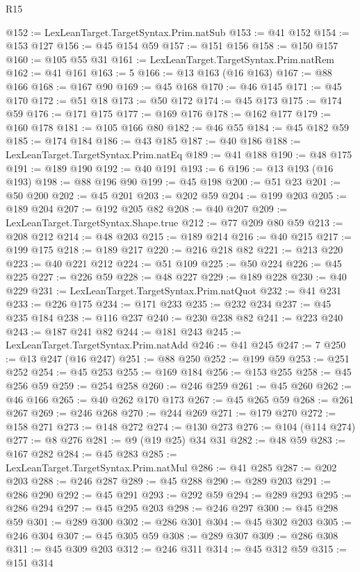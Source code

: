 \begin{lexlean}{R15}
\begin{coremodule}
@152 := LexLeanTarget.TargetSyntax.Prim.natSub
@153 := @41 @152
@154 := @153 @127
@156 := @45 @154 @59
@157 := @151 @156
@158 := @150 @157
@160 := @105 @55 @31
@161 := LexLeanTarget.TargetSyntax.Prim.natRem
@162 := @41 @161
@163 := 5
@166 := @13 @163 (@16 @163)
@167 := @88 @166
@168 := @167 @90
@169 := @45 @168
@170 := @46 @145
@171 := @45 @170
@172 := @51 @18
@173 := @50 @172
@174 := @45 @173
@175 := @174 @59
@176 := @171 @175
@177 := @169 @176
@178 := @162 @177
@179 := @160 @178
@181 := @105 @166 @80
@182 := @46 @55
@184 := @45 @182 @59
@185 := @174 @184
@186 := @43 @185
@187 := @40 @186
@188 := LexLeanTarget.TargetSyntax.Prim.natEq
@189 := @41 @188
@190 := @48 @175
@191 := @189 @190
@192 := @40 @191
@193 := 6
@196 := @13 @193 (@16 @193)
@198 := @88 @196 @90
@199 := @45 @198
@200 := @51 @23
@201 := @50 @200
@202 := @45 @201
@203 := @202 @59
@204 := @199 @203
@205 := @189 @204
@207 := @192 @205 @82
@208 := @40 @207
@209 := LexLeanTarget.TargetSyntax.Shape.true
@212 := @77 @209 @80 @59
@213 := @208 @212
@214 := @48 @203
@215 := @189 @214
@216 := @40 @215
@217 := @199 @175
@218 := @189 @217
@220 := @216 @218 @82
@221 := @213 @220
@223 := @40 @221 @212
@224 := @51 @109
@225 := @50 @224
@226 := @45 @225
@227 := @226 @59
@228 := @48 @227
@229 := @189 @228
@230 := @40 @229
@231 := LexLeanTarget.TargetSyntax.Prim.natQuot
@232 := @41 @231
@233 := @226 @175
@234 := @171 @233
@235 := @232 @234
@237 := @45 @235 @184
@238 := @116 @237
@240 := @230 @238 @82
@241 := @223 @240
@243 := @187 @241 @82
@244 := @181 @243
@245 := LexLeanTarget.TargetSyntax.Prim.natAdd
@246 := @41 @245
@247 := 7
@250 := @13 @247 (@16 @247)
@251 := @88 @250
@252 := @199 @59
@253 := @251 @252
@254 := @45 @253
@255 := @169 @184
@256 := @153 @255
@258 := @45 @256 @59
@259 := @254 @258
@260 := @246 @259
@261 := @45 @260
@262 := @46 @166
@265 := @40 @262 @170 @173
@267 := @45 @265 @59
@268 := @261 @267
@269 := @246 @268
@270 := @244 @269
@271 := @179 @270
@272 := @158 @271
@273 := @148 @272
@274 := @130 @273
@276 := @104 (@114 @274)
@277 := @8 @276
@281 := @9 (@19 @25) @34 @31
@282 := @48 @59
@283 := @167 @282
@284 := @45 @283
@285 := LexLeanTarget.TargetSyntax.Prim.natMul
@286 := @41 @285
@287 := @202 @203
@288 := @246 @287
@289 := @45 @288
@290 := @289 @203
@291 := @286 @290
@292 := @45 @291
@293 := @292 @59
@294 := @289 @293
@295 := @286 @294
@297 := @45 @295 @203
@298 := @246 @297
@300 := @45 @298 @59
@301 := @289 @300
@302 := @286 @301
@304 := @45 @302 @203
@305 := @246 @304
@307 := @45 @305 @59
@308 := @289 @307
@309 := @286 @308
@311 := @45 @309 @203
@312 := @246 @311
@314 := @45 @312 @59
@315 := @151 @314

\end{coremodule}
\end{lexlean}
